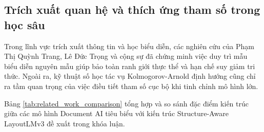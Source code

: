 \subsection{Trích xuất quan hệ và thích ứng tham số trong học sâu}
Trong lĩnh vực trích xuất thông tin và học biểu diễn, các nghiên cứu của Phạm Thị Quỳnh Trang, Lê Đức Trọng và cộng sự \cite{phamthi2022memory} đã chứng minh việc duy trì mẫu biểu diễn nguyên mẫu giúp bảo toàn ranh giới thực thể và hạn chế suy giảm tri thức. Ngoài ra, kỹ thuật số học tác vụ Kolmogorov-Arnold định hướng \cite{phamthi2025dakta} cũng chỉ ra tầm quan trọng của việc điều tiết tham số cục bộ khi tinh chỉnh mô hình lớn.

Bảng \ref{tab:related_work_comparison} tổng hợp và so sánh đặc điểm kiến trúc giữa các mô hình Document AI tiêu biểu với kiến trúc Structure-Aware LayoutLMv3 đề xuất trong khóa luận.

